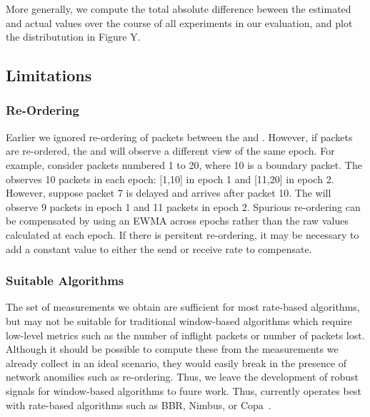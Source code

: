     More generally, we compute the total absolute difference beween the estimated and actual values over the
    course of all experiments in our evaluation, and plot the distributution in Figure Y.
    
\subsection{Limitations}
\subsubsection{Re-Ordering}
\label{s:measure:limitation:reorder}
Earlier we ignored re-ordering of packets between the \inbox and \outbox. However, if packets
are re-ordered, the \inbox and \outbox will observe a different view of the same epoch.
For example, consider packets numbered 1 to 20, where 10 is a boundary packet. The \inbox observes
10 packets in each epoch: [1,10] in epoch 1 and [11,20] in epoch 2. 
However, suppose packet 7 is delayed and arrives after packet 10. The \outbox will observe 9
packets in epoch 1 and 11 packets in epoch 2. 
Spurious re-ordering can be compensated by using an EWMA across epochs rather than the raw values
calculated at each epoch. If there is persitent re-ordering, it may be necessary to add a constant 
value to either the send or receive rate to compensate.

\subsubsection{Suitable Algorithms}
\label{s:measure:limitation:algs}
The set of measurements we obtain are sufficient for most rate-based algorithms, but may not be 
suitable for traditional window-based algorithms which require low-level metrics such as 
the number of inflight packets or number of packets lost. Although it should be possible
to compute these from the measurements we already collect in an ideal scenario, they would easily
break in the presence of network anomilies such as re-ordering. Thus, we leave the development
of robust signals for window-based algorithms to fuure work. 
Thus, \name currently operates best with rate-based algorithms such as BBR, Nimbus, or Copa~\cite{bbr,nimbus,copa}.
